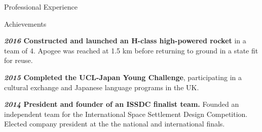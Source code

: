 \documentclass[10pt]{resume} %
\begin{document}
\begin{rSection}{Professional Experience}




\end{rSection}


\begin{rSection}{Achievements}
    \item \textbf{\textit{2016} Constructed and launched an H-class high-powered rocket} in a team of 4. Apogee was reached at 1.5 km before returning to ground in a state fit for reuse.
    \item \textbf{\textit{2015} Completed the UCL-Japan Young Challenge}, participating in a cultural exchange and Japanese language programs in the UK.
    \item \textbf{\textit{2014} President and founder of an ISSDC finalist team.} Founded an independent team for the International Space Settlement Design Competition. Elected company president at the the national and international finals.
\end{rSection}
\end{document}
